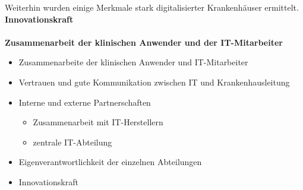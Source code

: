 Weiterhin wurden einige Merkmale stark digitalisierter Krankenhäuser ermittelt.
\vspace{\parheadvspace}\\
\textbf{Innovationskraft}\\
\vspace{\parheadvspace}\\
\textbf{Zusammenarbeit der klinischen Anwender und der IT-Mitarbeiter}\\
\begin{itemize}
	\item Zusammenarbeite der klinischen Anwender und IT-Mitarbeiter
	\item Vertrauen und gute Kommunikation zwischen IT und Krankenhausleitung
	\item Interne und externe Partnerschaften
	\begin{itemize}
		\item Zusammenarbeit mit IT-Herstellern
		\item zentrale IT-Abteilung
	\end{itemize}
	\item Eigenverantwortlichkeit der einzelnen Abteilungen
	\item Innovationskraft
\end{itemize}

